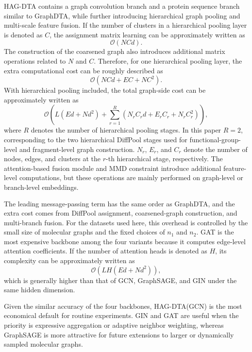 \documentclass[pdflatex,sn-mathphys-num]{sn-jnl}%
\theoremstyle{thmstyleone}%
\theoremstyle{thmstyletwo}%
\theoremstyle{thmstylethree}%
\begin{document}
HAG-DTA contains a graph convolution branch and a protein sequence branch similar to GraphDTA, while further introducing hierarchical graph pooling and multi-scale feature fusion. If the number of clusters in a hierarchical pooling layer is denoted as $C$, the assignment matrix learning can be approximately written as
\begin{equation}
\mathcal{O}\left(N C d\right).
\end{equation}
The construction of the coarsened graph also introduces additional matrix operations related to $N$ and $C$. Therefore, for one hierarchical pooling layer, the extra computational cost can be roughly described as
\begin{equation}
\mathcal{O}\left(N C d + E C + N C^2\right).
\end{equation}
With hierarchical pooling included, the total graph-side cost can be approximately written as
\begin{equation}
\mathcal{O}\left(L(E d + N d^2) + \sum_{r=1}^{R}(N_r C_r d + E_r C_r + N_r C_r^2)\right),
\end{equation}
where $R$ denotes the number of hierarchical pooling stages. In this paper $R=2$, corresponding to the two hierarchical DiffPool stages used for functional-group-level and fragment-level graph construction. $N_r$, $E_r$, and $C_r$ denote the number of nodes, edges, and clusters at the $r$-th hierarchical stage, respectively. The attention-based fusion module and MMD constraint introduce additional feature-level computations, but these operations are mainly performed on graph-level or branch-level embeddings.

The leading message-passing term has the same order as GraphDTA, and the extra cost comes from DiffPool assignment, coarsened-graph construction, and multi-branch fusion. For the datasets used here, this overhead is controlled by the small size of molecular graphs and the fixed choices of $n_1$ and $n_2$. GAT is the most expensive backbone among the four variants because it computes edge-level attention coefficients. If the number of attention heads is denoted as $H$, its complexity can be approximately written as
\begin{equation}
\mathcal{O}\left(LH(E d + N d^2)\right),
\end{equation}
which is generally higher than that of GCN, GraphSAGE, and GIN under the same hidden dimension.

Given the similar accuracy of the four backbones, HAG-DTA(GCN) is the most economical default for routine experiments. GIN and GAT are useful when the priority is expressive aggregation or adaptive neighbor weighting, whereas GraphSAGE is more attractive for future extensions to larger or dynamically sampled molecular graphs.
\end{document}
